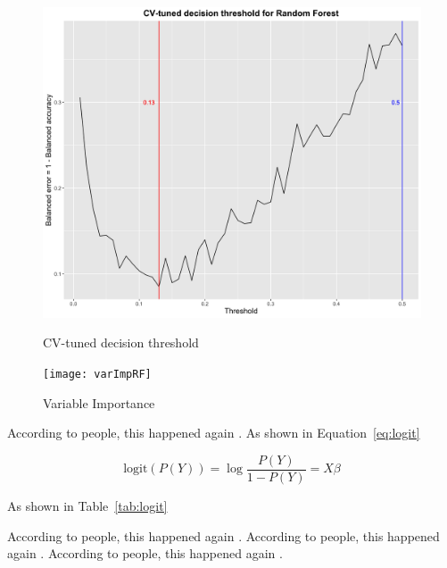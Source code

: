 \documentclass[12pt, man, a4paper, floatsintext]{apa7}
\begin{document}
\begin{figure}
    \centering
    \caption{CV-tuned decision threshold}
    \includegraphics[width=12cm]{cv_threshold}
    \label{fig:cv}
\end{figure}

\begin{figure}
    \centering
    \caption{Variable Importance}
    \texttt{[image: varImpRF]}
    \label{fig:varImp}
\end{figure}

According to people, this happened again \parencite{Chat2018}.
As shown in Equation~\ref{eq:logit}

\begin{equation}
    \text{logit}(P(Y)) = \log{\frac{P(Y)}{1-P(Y)}} = X \beta
    \label{eq:logit}
\end{equation}



As shown in Table~\ref{tab:logit}

% 

According to people, this happened again \parencite{Chat2018}.
According to people, this happened again \parencite{Chat2018}.
According to people, this happened again \parencite{Chat2018}.

    \clearpage

    \printbibliography
\end{document}
